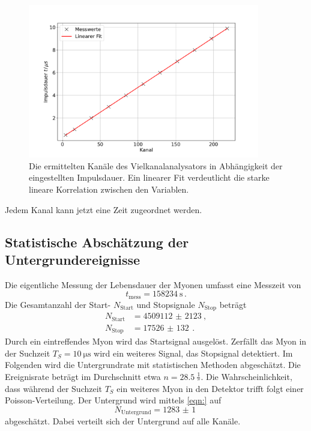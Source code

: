 \begin{figure}
    \centering
    \includegraphics[width=0.9\textwidth]{content/plots/calibration.pdf}
    \caption{Die ermittelten Kanäle des Vielkanalanalysators in Abhängigkeit der eingestellten Impulsdauer.
    Ein linearer Fit verdeutlicht die starke lineare Korrelation zwischen den Variablen.
    }
    \label{fig:kalibration}
\end{figure}
Jedem Kanal kann jetzt eine Zeit zugeordnet werden.
\FloatBarrier

\subsection{Statistische Abschätzung der Untergrundereignisse}
\label{sec:untergrund}
Die eigentliche Messung der Lebensdauer der Myonen umfasst eine Messzeit von
\begin{equation*}
    t_\text{mess} = \qty{158234}{\second} \,.
\end{equation*}
Die Gesamtanzahl der Start- $N_\text{Start}$ und Stopsignale $N_\text{Stop}$ beträgt
\begin{align*}
    N_\text{Start} &= \qty{4509112(2123)}{}, \\
    N_\text{Stop} &= \qty{17526(132)}{} \,.
\end{align*}
Durch ein eintreffendes Myon wird das Startsignal ausgelöst.
Zerfällt das Myon in der Suchzeit $T_S = \qty{10}{\micro\second}$ wird ein weiteres Signal, das Stopsignal detektiert.
Im Folgenden wird die Untergrundrate mit statistischen Methoden abgeschätzt.
Die Ereignisrate beträgt im Durchschnitt etwa $n = \qty{28.5}{\frac{1}{\second}}$.
Die Wahrscheinlichkeit, dass während der Suchzeit $T_S$ ein weiteres Myon in den Detektor trifft folgt einer Poisson-Verteilung.  
Der Untergrund wird mittels \autoref{eqn:} auf %
\begin{equation}
    N_\text{Untergrund} = \qty{1283(1)}{}
    \label{eqn:untergrund}
\end{equation}
abgeschätzt.
Dabei verteilt sich der Untergrund auf alle Kanäle.
\FloatBarrier

